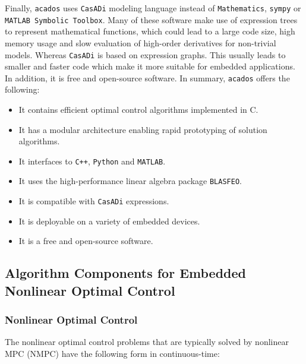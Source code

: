 \documentclass{thesisreport}
\begin{document}
Finally, \texttt{acados} uses \texttt{CasADi} modeling language instead of \texttt{Mathematics}, \texttt{sympy} or \texttt{MATLAB Symbolic Toolbox}. Many of these software make use of expression trees to represent mathematical functions, which could lead to a large code size, high memory usage and slow evaluation of high-order derivatives for non-trivial models. Whereas \texttt{CasADi} is based on expression graphs. This usually leads to smaller and faster code which make it more suitable for embedded applications. In addition, it is free and open-source software. In summary, \texttt{acados} offers the following:

\begin{itemize}
	\item It contains efficient optimal control algorithms implemented in C.
	\item It has a modular architecture enabling rapid prototyping of solution algorithms.
	\item It interfaces to \texttt{C++}, \texttt{Python} and \texttt{MATLAB}.
	\item It uses the high-performance linear algebra package \texttt{BLASFEO}.
	\item It is compatible with \texttt{CasADi} expressions.
	\item It is deployable on a variety of embedded devices.
	\item It is a free and open-source software.
\end{itemize}

\newpage

\subsection{Algorithm Components for Embedded Nonlinear Optimal Control}

\subsubsection{Nonlinear Optimal Control}

The nonlinear optimal control problems that are typically solved by nonlinear MPC (NMPC) have the following form in continuous-time:
\end{document}
